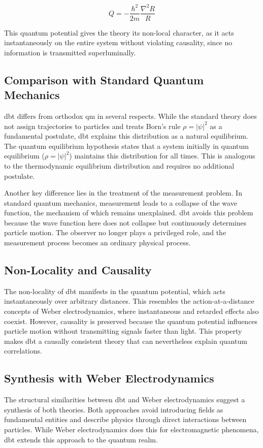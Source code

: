 \begin{equation}
    Q = -\frac{\hbar^2}{2m} \frac{\nabla^2 R}{R}
\end{equation}

This quantum potential gives the theory its non-local character, as it acts instantaneously on the entire system without violating causality, since no information is transmitted superluminally.

\subsection{Comparison with Standard Quantum Mechanics}
\gls{dbt} differs from orthodox \gls{qm} in several respects. While the standard theory does not assign trajectories to particles and treats Born's rule $\rho = \lvert \psi \rvert^{2}$ as a fundamental postulate, \gls{dbt} explains this distribution as a natural equilibrium. The quantum equilibrium hypothesis states that a system initially in quantum equilibrium ($\rho = \lvert \psi \rvert^{2}$) maintains this distribution for all times. This is analogous to the thermodynamic equilibrium distribution and requires no additional postulate.

Another key difference lies in the treatment of the measurement problem. In standard quantum mechanics, measurement leads to a collapse of the wave function, the mechanism of which remains unexplained. \gls{dbt} avoids this problem because the wave function here does not collapse but continuously determines particle motion. The observer no longer plays a privileged role, and the measurement process becomes an ordinary physical process.

\subsection{Non-Locality and Causality}
The non-locality of \gls{dbt} manifests in the quantum potential, which acts instantaneously over arbitrary distances. This resembles the action-at-a-distance concepts of Weber electrodynamics, where instantaneous and retarded effects also coexist. However, causality is preserved because the quantum potential influences particle motion without transmitting signals faster than light. This property makes \gls{dbt} a causally consistent theory that can nevertheless explain quantum correlations.

\subsection{Synthesis with Weber Electrodynamics}
The structural similarities between \gls{dbt} and Weber electrodynamics suggest a synthesis of both theories. Both approaches avoid introducing fields as fundamental entities and describe physics through direct interactions between particles. While Weber electrodynamics does this for electromagnetic phenomena, \gls{dbt} extends this approach to the quantum realm.

